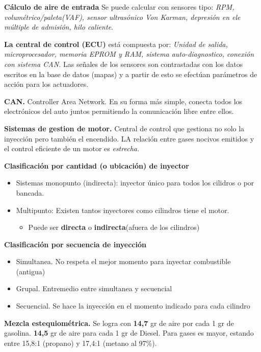 {\bf Cálculo de aire de entrada} Se puede calcular con sensores tipo: \emph{RPM, volumétrico/paleta(VAF), sensor ultrasónico Von Karman, depresión en ele múltiple de admisión, hilo caliente}.

{\bf La central de control (ECU)} está compuesta por: \emph{Unidad de salida, microprocesador, memoria EPROM y RAM, sistema auto-diagnostico, conexión con sistema CAN.} Las señales de los sensores son contrastadas con los datos escritos en la base de datos (mapas) y a partir de esto se efectúan parámetros de acción para los actuadores.

{\bf CAN.} Controller Area Network. En su forma más simple, conecta todos los electrónicos del auto juntos permitiendo la comunicación libre entre ellos.

{\bf Sistemas de gestion de motor.} Central de control que gestiona no solo la inyección pero también el encendido. LA relación entre gases nocivos emitidos y el control eficiente de un motor es \emph{estrecha.}

{\bf Clasificación por cantidad (o ubicación) de inyector}

\begin{itemize}
    \item Sistemas monopunto (indirecta): inyector único para todos los cilidros o por bancada.
    \item Multipunto: Existen tantos inyectores como cilindros tiene el motor.
    \begin{itemize}
        \item Puede ser \textbf{directa} o \textbf{indirecta}(afuera de los cilindros)
    \end{itemize}
\end{itemize}

{\bf Clasificación por secuencia de inyección}

\begin{itemize}
    \item Simultanea. No respeta el mejor momento para inyectar combustible (antigua)
    \item Grupal. Entremedio entre simultanea y secuencial
    \item Secuencial. Se hace la inyección en el momento indicado para cada cilindro
\end{itemize}

{\bf Mezcla estequiométrica.} Se logra con {\bf14,7} gr de aire por cada 1 gr de gasolina. {\bf 14,5} gr de aire para cada 1 gr de Diesel. Para gases es mayor, estando entre 15,8:1 (propano) y 17,4:1 (metano al 97\%).

